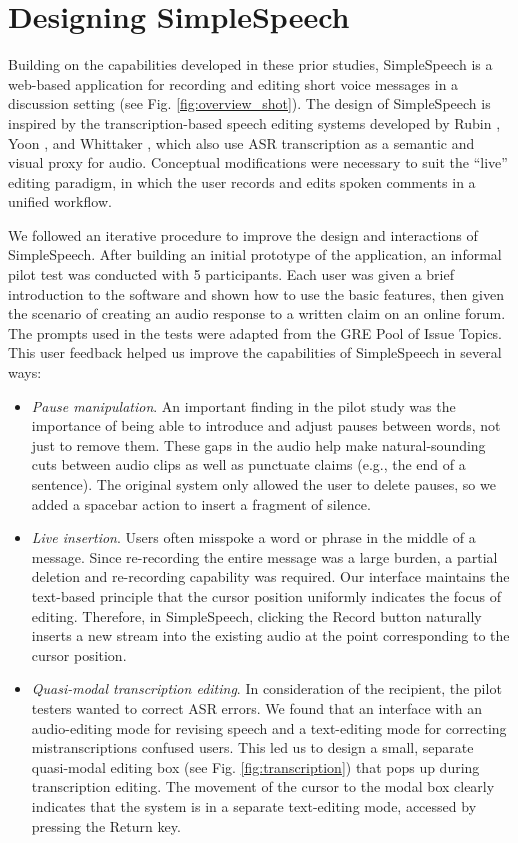 
\section{Designing SimpleSpeech}

Building on the capabilities developed in these prior studies, SimpleSpeech is a web-based application for recording and editing short voice messages in a discussion setting (see Fig. \ref{fig:overview_shot}).
The design of SimpleSpeech is inspired by the transcription-based speech editing systems developed by Rubin \cite{rubin}, Yoon \cite{yoon}, and Whittaker \cite{whittaker_semantic}, which also use ASR transcription as a semantic and visual proxy for audio.
Conceptual modifications were necessary to suit the ``live'' editing paradigm, in which the user records and edits spoken comments in a unified workflow.

We followed an iterative procedure to improve the design and interactions of SimpleSpeech.
After building an initial prototype of the application, an informal pilot test was conducted with 5 participants. 
Each user was given a brief introduction to the software and shown how to use the basic features, then given the scenario of creating an audio response to a written claim on an online forum. 
The prompts used in the tests were adapted from the GRE Pool of Issue Topics.
This user feedback helped us improve the capabilities of SimpleSpeech in several ways:

\begin{itemize}
	\item \emph{Pause manipulation}. An important finding in the pilot study was the importance of being able to introduce and adjust pauses between words, not just to remove them.
	These gaps in the audio help make natural-sounding cuts between audio clips as well as punctuate claims (e.g., the end of a sentence). 
	The original system only allowed the user to delete pauses, so we added a spacebar action to insert a fragment of silence.
	\item \emph{Live insertion}. Users often misspoke a word or phrase in the middle of a message.
	Since re-recording the entire message was a large burden, a partial deletion and re-recording capability was required.
	Our interface maintains the text-based principle that the cursor position uniformly indicates the focus of editing.
	Therefore, in SimpleSpeech, clicking the Record button naturally inserts a new stream into the existing audio at the point corresponding to the cursor position.
	\item \emph{Quasi-modal transcription editing}. In consideration of the recipient, the pilot testers wanted to correct ASR errors.
	We found that an interface with an audio-editing mode for revising speech and a text-editing mode for correcting mistranscriptions confused users.
	This led us to design a small, separate quasi-modal editing box (see Fig. \ref{fig:transcription}) that pops up during transcription editing.
	The movement of the cursor to the modal box clearly indicates that the system is in a separate text-editing mode, accessed by pressing the Return key.
\end{itemize}



